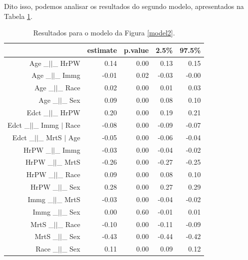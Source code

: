 \documentclass[11pt,letterpaper,twocolumn]{article}
\begin{document}
Dito isso, podemos analisar os resultados do segundo modelo, apresentados na Tabela \ref{r1m2}.
\begin{table}[ht]
    \centering
    \begin{tabular}{rrrrr}
        \hline
        & estimate & p.value & 2.5\% & 97.5\% \\ 
        \hline
        Age \_$||$\_ HrPW & 0.14 & 0.00 & 0.13 & 0.15 \\ 
        Age \_$||$\_ Immg & -0.01 & 0.02 & -0.03 & -0.00 \\ 
        Age \_$||$\_ Race & 0.02 & 0.00 & 0.01 & 0.03 \\ 
        Age \_$||$\_ Sex & 0.09 & 0.00 & 0.08 & 0.10 \\ 
        Edct \_$||$\_ HrPW & 0.20 & 0.00 & 0.19 & 0.21 \\ 
        Edct \_$||$\_ Immg $|$ Race & -0.08 & 0.00 & -0.09 & -0.07 \\ 
        Edct \_$||$\_ MrtS $|$ Age & -0.05 & 0.00 & -0.06 & -0.04 \\ 
        HrPW \_$||$\_ Immg & -0.03 & 0.00 & -0.04 & -0.02 \\ 
        HrPW \_$||$\_ MrtS & -0.26 & 0.00 & -0.27 & -0.25 \\ 
        HrPW \_$||$\_ Race & 0.09 & 0.00 & 0.08 & 0.10 \\ 
        HrPW \_$||$\_ Sex & 0.28 & 0.00 & 0.27 & 0.29 \\ 
        Immg \_$||$\_ MrtS & -0.03 & 0.00 & -0.04 & -0.02 \\ 
        Immg \_$||$\_ Sex & 0.00 & 0.60 & -0.01 & 0.01 \\ 
        MrtS \_$||$\_ Race & -0.10 & 0.00 & -0.11 & -0.09 \\ 
        MrtS \_$||$\_ Sex & -0.43 & 0.00 & -0.44 & -0.42 \\ 
        Race \_$||$\_ Sex & 0.11 & 0.00 & 0.09 & 0.12 \\ 
        \hline
    \end{tabular}
    \caption{Resultados para o modelo da Figura \ref{model2}.}
    \label{r1m2}
\end{table}
\end{document}
